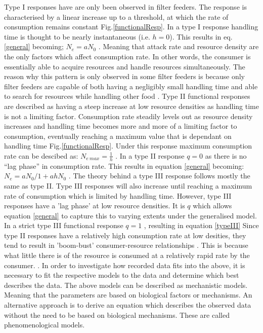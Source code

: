 \documentclass[a4paper]{article}
\numberwithin{equation}{section}
\begin{document}
Type I responses have are only been observed in filter feeders\citep{Jeschke2004}.  The response is characterised by a linear increase up to a threshold, at which the rate of consumption remains constant Fig.\ref{functionalResp}.  In a type I response handling time is thought to be nearly instantaneous (i.e. $h = 0$).  This results in eq. \ref{general} becoming;
 $N_e = aN_0$ \citep{Dunn2020}.  
Meaning that attack rate and resource density are the only factors which affect consumption rate.  In other words, the consumer is essentially able to acquire resources and handle resources simultaneously.  The reason why this pattern is only observed in some filter feeders is because only filter feeders are capable of both having a negligibly small handling time and able to search for resources while handling other food \citep{Jeschke2004}.
\newline
Type II functional responses are described as having a steep increase at low resource densities as handling time is not a limiting factor.  Consumption rate steadily levels out as resource density increases and handling time becomes more and more of a limiting factor to consumption, eventually reaching a maximum value that is dependant on handling time Fig.\ref{functionalResp}.  Under this response maximum consumption rate can be descibed as:
$N_{e \ max} = \frac{1}{h}$ \citep{Rosenbaum2018}.
\newline
In a type II response $q = 0$ as there is no “lag phase” in consumption rate.  This results in equation \ref{general} becoming:
 $N_e = aN_0  / 1+ahN_0$  \citep{Rosenbaum2018, Dunn2020}.
\newline
The theory behind a type III response follows mostly the same as type II.  Type III responses will also increase until reaching a maximum rate of consumption which is limited by handling time.  However, type III responses have a 'lag phase' at low resource densities.  It is $q$ which allows equation \ref{general} to capture this to varying extents under the generalised model.  In a strict type III functional response $q = 1$ \citep{Rosenbaum2018}, resulting in equation \ref{typeIII}
\newline
Since type II responses have a relatively high consumption rate at low desities, they tend to result in 'boom-bust' consumer-resource relationships \citep{Dunn2020, Rosenbaum2018, Real1979, Holling1959a, Vucic-Pestic2010}.  This is because what little there is of the resource is consumed at a relatively rapid rate by the consumer. .
\newline
In order to investigate how recorded data fits into the above, it is necessary to fit the respective models to the data and determine which best describes the data.  The above models can be described as mechanistic models.  Meaning that the parameters are based on biological factors or mechanisms.  An alternative approach is to derive an equation which describes the observed data without the need to be based on biological mechanisms.  These are called phenomenological models.
\end{document}
